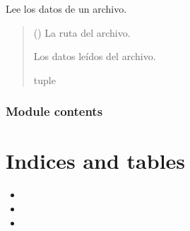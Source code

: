 \documentclass[letterpaper,10pt,spanish]{sphinxmanual}
\begin{document}
\begin{fulllineitems}
\label{\detokenize{Funcionales:Funcionales.calendario.leer_datos_desde_archivo}}
\pysigstartsignatures
{}
\pysigstopsignatures
\sphinxAtStartPar
Lee los datos de un archivo.
\begin{quote}\begin{description}
\sphinxAtStartPar
{} () \textendash{} La ruta del archivo.

\sphinxAtStartPar
Los datos leídos del archivo.

\sphinxAtStartPar
tuple

\end{description}\end{quote}

\end{fulllineitems}



\subsection{Module contents}
\label{\detokenize{Funcionales:module-Funcionales}}\label{\detokenize{Funcionales:module-contents}}

\chapter{Indices and tables}
\label{\detokenize{index:indices-and-tables}}\begin{itemize}
\item {} 
\sphinxAtStartPar
{}

\item {} 
\sphinxAtStartPar
{}

\item {} 
\sphinxAtStartPar
{}

\end{itemize}


\renewcommand{\indexname}{Índice de Módulos Python}
\begin{sphinxtheindex}
\let\bigletter\sphinxstyleindexlettergroup
\bigletter{f}
\item\relax{}
\item\relax{}
\end{sphinxtheindex}

\renewcommand{\indexname}{Índice}
\printindex
\end{document}
